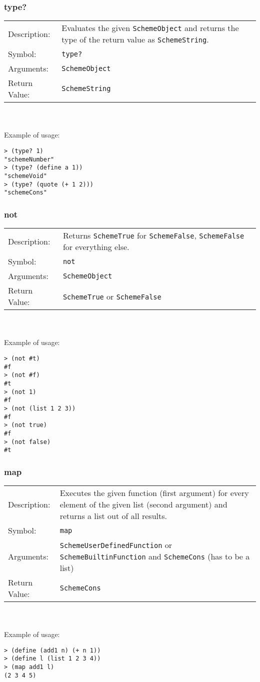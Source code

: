 \documentclass[12pt,a4paper]{scrartcl}
\begin{document}
\subsubsection*{type?}
\begin{tabular}{l  p{13cm}}
Description: & Evaluates the given \lstinline{SchemeObject} and returns the type of the return value as \lstinline{SchemeString}.\\
Symbol: & \lstinline{type?}\\
Arguments: & \lstinline{SchemeObject}\\
Return Value: & \lstinline{SchemeString}
\end{tabular}
\\
\\
Example of usage:
\begin{lstlisting}
> (type? 1)
"schemeNumber"
> (type? (define a 1))
"schemeVoid"
> (type? (quote (+ 1 2)))
"schemeCons"
\end{lstlisting}

\subsubsection*{not}
\begin{tabular}{l  p{13cm}}
Description: & Returns \lstinline{SchemeTrue} for \lstinline{SchemeFalse}, \lstinline{SchemeFalse} for everything else.\\
Symbol: & \lstinline{not}\\
Arguments: & \lstinline{SchemeObject}\\
Return Value: & \lstinline{SchemeTrue} or \lstinline{SchemeFalse}
\end{tabular}
\\
\\
Example of usage:
\begin{lstlisting}
> (not #t)
#f
> (not #f)
#t
> (not 1)
#f
> (not (list 1 2 3))
#f
> (not true)
#f
> (not false)
#t
\end{lstlisting}


\subsubsection*{map}
\begin{tabular}{l  p{13cm}}
Description: & Executes the given function (first argument) for every element of the given list (second argument) and returns a list out of all results.\\
Symbol: & \lstinline{map}\\
Arguments: & \lstinline{SchemeUserDefinedFunction} or \lstinline{SchemeBuiltinFunction} and \lstinline{SchemeCons} (has to be a list)\\
Return Value: & \lstinline{SchemeCons}
\end{tabular}
\\
\\
Example of usage:
\begin{lstlisting}
> (define (add1 n) (+ n 1))
> (define l (list 1 2 3 4))
> (map add1 l)
(2 3 4 5)
\end{lstlisting}
\end{document}
